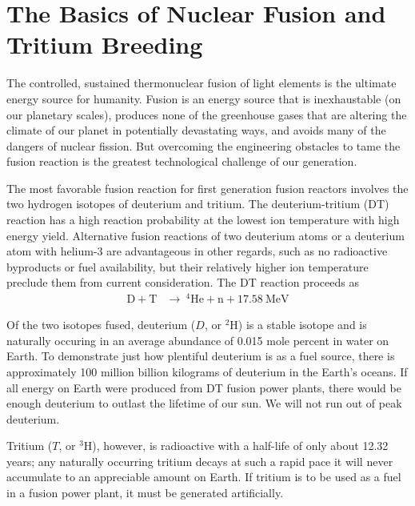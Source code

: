 \section{The Basics of Nuclear Fusion and Tritium Breeding}\label{sec:fusion-basics}
The controlled, sustained thermonuclear fusion of light elements is the ultimate energy source for humanity. Fusion is an energy source that is inexhaustable (on our planetary scales), produces none of the greenhouse gases that are altering the climate of our planet in potentially devastating ways, and avoids many of the dangers of nuclear fission. But overcoming the engineering obstacles to tame the fusion reaction is the greatest technological challenge of our generation.

The most favorable fusion reaction for first generation fusion reactors involves the two hydrogen isotopes of deuterium and tritium. The deuterium-tritium (DT) reaction has a high reaction probability at the lowest ion temperature with high energy yield. Alternative fusion reactions of two deuterium atoms or a deuterium atom with helium-3 are advantageous in other regards, such as no radioactive byproducts or fuel availability, but their relatively higher ion temperature preclude them from current consideration. The DT reaction proceeds as
\begin{align}
	\mathrm{D} + \mathrm{T}&\xrightarrow{}~^4\mathrm{He}+\mathrm{n}+17.58~\text{MeV} \label{eq:dt-reaction}
\end{align}

Of the two isotopes fused, deuterium ($D$, or $^2$H) is a stable isotope and is naturally occuring in an average abundance of 0.015 mole percent in water on Earth. To demonstrate just how plentiful deuterium is as a fuel source, there is approximately 100 million billion kilograms of deuterium in the Earth's oceans. If all energy on Earth were produced from DT fusion power plants, there would be enough deuterium to outlast the lifetime of our sun. We will not run out of peak deuterium.  

Tritium ($T$, or $^3$H), however, is radioactive with a half-life of only about 12.32 years; any naturally occurring tritium decays at such a rapid pace it will never accumulate to an appreciable amount on Earth. If tritium is to be used as a fuel in a fusion power plant, it must be generated artificially. 


